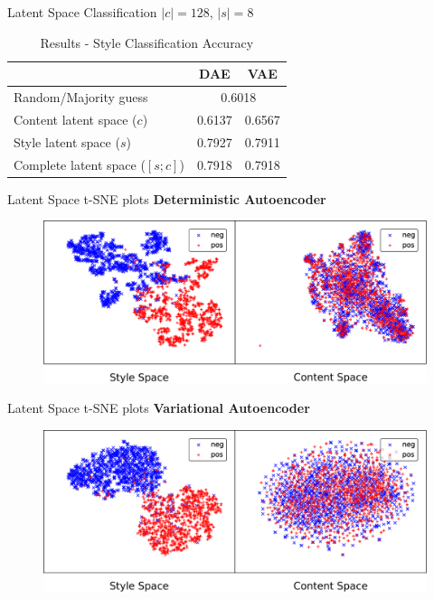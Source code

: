 \documentclass[aspectratio=169]{beamer}
\newcommand{\tabh}[1]{\multicolumn{1}{c|}{\textbf{#1}}}
\begin{document}
\begin{frame}{Latent Space Classification}
	\centering
	$|c| = 128$, $|s| = 8$

	\begin{table}[ht]
		\begin{tabular}{| l || r | r |}
			\hline
			                                & \tabh{DAE}                  & \tabh{VAE} \\
			\hline \hline
			Random/Majority guess           & \multicolumn{2}{c|}{0.6018}              \\ \hline \hline
			Content latent space  ($c$)     & 0.6137                      & 0.6567     \\ \hline
			Style latent space ($s$)        & 0.7927                      & 0.7911     \\ \hline
			Complete latent space ($[s;c]$) & 0.7918                      & 0.7918     \\
			\hline
		\end{tabular}
		\caption{Results - Style Classification Accuracy}
		\label{tab:latent-space-classification}
	\end{table}
\end{frame}

\begin{frame}{Latent Space t-SNE plots}
	\centering
	\textbf{Deterministic Autoencoder}

	\begin{figure}[ht]
		\includegraphics[width=\textwidth]{images/dae-latent-spaces}
	\end{figure}
\end{frame}

\begin{frame}{Latent Space t-SNE plots}
	\centering
	\textbf{Variational Autoencoder}

	\begin{figure}[ht]
		\includegraphics[width=\textwidth]{images/vae-latent-spaces}
	\end{figure}
\end{frame}
\end{document}
